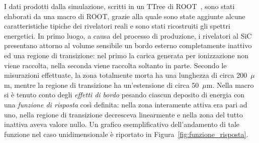 I dati prodotti dalla simulazione, scritti in un TTree di ROOT~\cite{brun:nima97}, sono stati elaborati da una macro di ROOT, grazie alla quale sono state aggiunte alcune caratteristiche tipiche dei rivelatori reali e sono stati ricostruiti gli spettri energetici.
%
In primo luogo, a causa del processo di produzione, i rivelatori al SiC presentano attorno al volume sensibile un bordo esterno completamente inattivo ed una regione di transizione: nel primo la carica generata per ionizzazione non viene raccolta, nella seconda viene raccolta soltanto in parte.
Secondo le misurazioni effettuate, la zona totalmente morta ha una lunghezza di circa 200~$\mu$m, mentre la regione di transizione ha un'estensione di circa 50~$\mu$m. 
%
Nella macro si è tenuto conto degli \emph{effetti di bordo} pesando ciascun deposito di energia con una \emph{funzione di risposta} così definita: nella zona interamente attiva era pari ad uno, nella regione di transizione decresceva linearmente e nella zona del tutto inattiva aveva valore nullo.
Un grafico esemplificativo dell'andamento di tale funzione nel caso unidimensionale è riportato in Figura~\ref{fig:funzione_risposta}.


